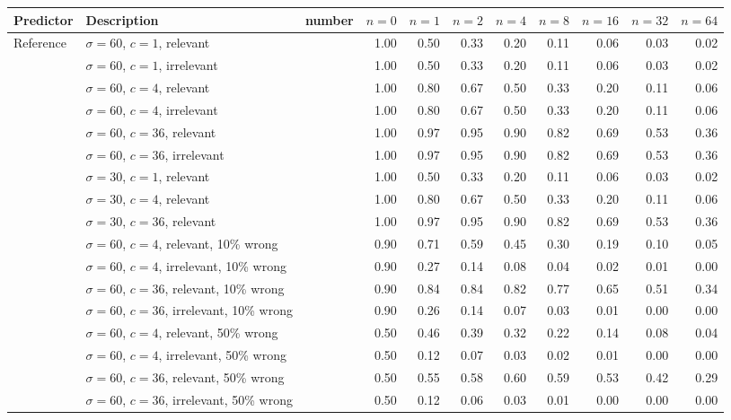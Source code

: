 \begin{tabular}{llrrrrrrrrr}
\toprule
Predictor & Description & number & $n = 0$ & $n = 1$ & $n = 2$ & $n = 4$ & $n = 8$ & $n = 16$ & $n = 32$ & $n = 64$ \\
\midrule
Reference & $\sigma = 60$, $c = 1$, relevant &  & 1.00 & 0.50 & 0.33 & 0.20 & 0.11 & 0.06 & 0.03 & 0.02 \\
 & $\sigma = 60$, $c = 1$, irrelevant &  & 1.00 & 0.50 & 0.33 & 0.20 & 0.11 & 0.06 & 0.03 & 0.02 \\
 & $\sigma = 60$, $c = 4$, relevant &  & 1.00 & 0.80 & 0.67 & 0.50 & 0.33 & 0.20 & 0.11 & 0.06 \\
 & $\sigma = 60$, $c = 4$, irrelevant &  & 1.00 & 0.80 & 0.67 & 0.50 & 0.33 & 0.20 & 0.11 & 0.06 \\
 & $\sigma = 60$, $c = 36$, relevant &  & 1.00 & 0.97 & 0.95 & 0.90 & 0.82 & 0.69 & 0.53 & 0.36 \\
 & $\sigma = 60$, $c = 36$, irrelevant &  & 1.00 & 0.97 & 0.95 & 0.90 & 0.82 & 0.69 & 0.53 & 0.36 \\
 & $\sigma = 30$, $c = 1$, relevant &  & 1.00 & 0.50 & 0.33 & 0.20 & 0.11 & 0.06 & 0.03 & 0.02 \\
 & $\sigma = 30$, $c = 4$, relevant &  & 1.00 & 0.80 & 0.67 & 0.50 & 0.33 & 0.20 & 0.11 & 0.06 \\
 & $\sigma = 30$, $c = 36$, relevant &  & 1.00 & 0.97 & 0.95 & 0.90 & 0.82 & 0.69 & 0.53 & 0.36 \\
 & $\sigma = 60$, $c = 4$, relevant, 10\% wrong &  & 0.90 & 0.71 & 0.59 & 0.45 & 0.30 & 0.19 & 0.10 & 0.05 \\
 & $\sigma = 60$, $c = 4$, irrelevant, 10\% wrong &  & 0.90 & 0.27 & 0.14 & 0.08 & 0.04 & 0.02 & 0.01 & 0.00 \\
 & $\sigma = 60$, $c = 36$, relevant, 10\% wrong &  & 0.90 & 0.84 & 0.84 & 0.82 & 0.77 & 0.65 & 0.51 & 0.34 \\
 & $\sigma = 60$, $c = 36$, irrelevant, 10\% wrong &  & 0.90 & 0.26 & 0.14 & 0.07 & 0.03 & 0.01 & 0.00 & 0.00 \\
 & $\sigma = 60$, $c = 4$, relevant, 50\% wrong &  & 0.50 & 0.46 & 0.39 & 0.32 & 0.22 & 0.14 & 0.08 & 0.04 \\
 & $\sigma = 60$, $c = 4$, irrelevant, 50\% wrong &  & 0.50 & 0.12 & 0.07 & 0.03 & 0.02 & 0.01 & 0.00 & 0.00 \\
 & $\sigma = 60$, $c = 36$, relevant, 50\% wrong &  & 0.50 & 0.55 & 0.58 & 0.60 & 0.59 & 0.53 & 0.42 & 0.29 \\
 & $\sigma = 60$, $c = 36$, irrelevant, 50\% wrong &  & 0.50 & 0.12 & 0.06 & 0.03 & 0.01 & 0.00 & 0.00 & 0.00 \\

\end{tabular}
